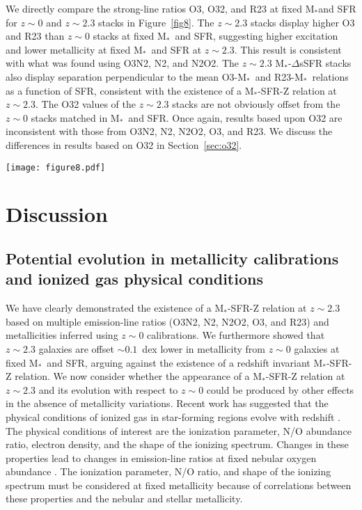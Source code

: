 \documentclass[iop,twocolappendix]{emulateapj}
\newcommand{\mstar}{$\mbox{M}_*$}
\begin{document}
We directly compare the strong-line ratios O3, O32, and R23 at fixed \mstar and SFR
 for $z\sim0$ and $z\sim2.3$ stacks in Figure~\ref{fig8}.
  The $z\sim2.3$ stacks display higher O3 and R23 than $z\sim0$ stacks at fixed \mstar\ and SFR,
 suggesting higher excitation and lower metallicity at fixed \mstar\ and SFR at $z\sim2.3$.
  This result is consistent with what was found using O3N2, N2, and N2O2.
  The $z\sim2.3$ \mstar-$\Delta$sSFR stacks also display separation perpendicular to the mean O3-\mstar\
 and R23-\mstar\ relations
 as a function of SFR, consistent with the existence of a \mstar-SFR-Z relation at $z\sim2.3$.
  The O32 values of the $z\sim2.3$ stacks are not obviously offset from the $z\sim0$ stacks
 matched in \mstar\ and SFR.  Once again, results based upon O32 are inconsistent with those
 from O3N2, N2, N2O2, O3, and R23.  We discuss the differences in results based on O32 in Section~\ref{sec:o32}.

\begin{figure*}
 \texttt{[image: figure8.pdf]}
 \centering
 \caption{The line ratios O3 (left), O32 (middle), and R23 (right) as a function of \mstar.  Points and lines
 are the same as in Figure~\ref{fig7}.
}\label{fig8}
\end{figure*}
 
\section{Discussion}\label{sec4}

\subsection{Potential evolution in metallicity calibrations and ionized gas physical conditions}\label{sec:evolution}

We have clearly demonstrated the existence of a \mstar-SFR-Z relation at $z\sim2.3$
 based on multiple emission-line ratios (O3N2, N2, N2O2, O3, and R23) and metallicities inferred
 using $z\sim0$ calibrations.  We furthermore showed that $z\sim2.3$ galaxies are offset
 $\sim0.1$~dex lower in metallicity from $z\sim0$ galaxies at fixed \mstar\ and SFR,
 arguing against the existence of a redshift invariant \mstar-SFR-Z relation.
  We now consider whether the appearance of a \mstar-SFR-Z relation at $z\sim2.3$
 and its evolution with respect to $z\sim0$ could be produced by other effects in the
 absence of metallicity variations.
  Recent work has suggested that the physical conditions of ionized gas in star-forming
 regions evolve with redshift \citep[e.g.,][]{ste14,ste16,sha15,san16a,str17,kas17}.
  The physical conditions of interest are the ionization parameter, N/O abundance ratio,
 electron density, and the shape of the ionizing spectrum.  Changes in these properties
 lead to changes in emission-line ratios at fixed nebular oxygen abundance \citep{kew13}.
  The ionization parameter, N/O
 ratio, and shape of the ionizing spectrum must be considered at fixed metallicity because
 of correlations between these properties and the nebular and stellar metallicity.
\end{document}
